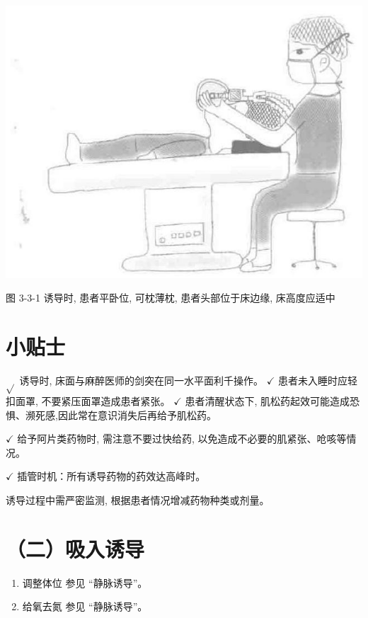 \documentclass[10pt]{article}
\begin{document}
\begin{center}
\includegraphics[max width=\textwidth]{2024_07_05_645bb794a4d4f32ee0c8g-082}
\end{center}

图 3-3-1 诱导时, 患者平卧位, 可枕薄枕, 患者头部位于床边缘, 床高度应适中

\section*{小贴士}
$\sqrt{ }$ 诱导时, 床面与麻醉医师的剑突在同一水平面利千操作。 $\checkmark$ 患者未入睡时应轻扣面罩, 不要紧压面罩造成患者紧张。 $\checkmark$ 患者清醒状态下, 肌松药起效可能造成恐惧、濒死感,因此常在意识消失后再给予肌松药。

$\checkmark$ 给予阿片类药物时, 需注意不要过快给药, 以免造成不必要的肌紧张、呛咳等情况。

$\checkmark$ 插管时机：所有诱导药物的药效达高峰时。

诱导过程中需严密监测, 根据患者情况增减药物种类或剂量。

\section*{（二）吸入诱导}
\begin{enumerate}
  \item 调整体位 参见 “静脉诱导”。

  \item 给氧去氮 参见 “静脉诱导”。

\end{enumerate}
\end{document}
